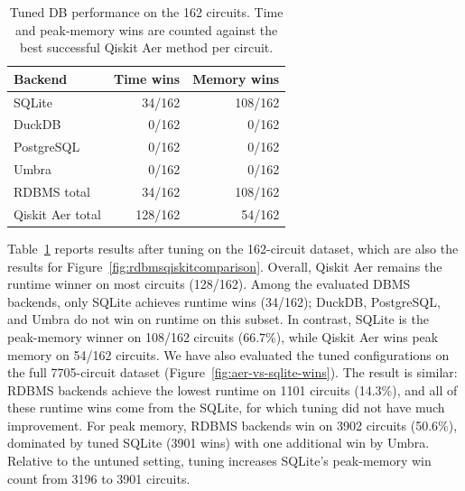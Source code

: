 \begin{table}[t]
  \centering
  \caption{Tuned DB performance on the 162 circuits. Time and peak-memory wins are counted against the best successful Qiskit Aer method per circuit.}
  \label{tab:finetuned-rdbms-results}
  \small
  \setlength{\tabcolsep}{6pt}
  \begin{tabular}{lrr}
    \toprule
    \textbf{Backend} & \textbf{Time wins} & \textbf{Memory wins} \\
    \midrule
    SQLite      & 34/162  & 108/162 \\
    DuckDB      & 0/162   & 0/162 \\
    PostgreSQL  & 0/162   & 0/162 \\
    Umbra       & 0/162   & 0/162 \\
    \midrule
    RDBMS total     & 34/162  & 108/162 \\
    Qiskit Aer total & 128/162 & 54/162 \\
    \bottomrule
  \end{tabular}
\end{table}

Table~\ref{tab:finetuned-rdbms-results} reports results after tuning 
on the 162-circuit dataset, which are also the results for Figure~\ref{fig:rdbmsqiskitcomparison}. Overall, Qiskit Aer
remains the runtime winner on most circuits (128/162). Among the evaluated DBMS backends,
only SQLite achieves runtime wins (34/162); DuckDB, PostgreSQL, and Umbra do not win on
runtime on this subset. In contrast, SQLite is the peak-memory winner on 108/162 circuits ($66.7\%$),
while Qiskit Aer wins peak memory on 54/162 circuits.
We have also evaluated the tuned configurations on the full \num{7705}-circuit dataset
(Figure~\ref{fig:aer-vs-sqlite-wins}). The result is similar: RDBMS backends achieve the
lowest runtime on \num{1101} circuits (14.3\%), and all of these runtime wins come from the SQLite, for which tuning did not have much improvement. For peak memory, RDBMS backends win on \num{3902}
circuits (50.6\%), dominated by tuned SQLite (\num{3901} wins) with one additional win
by Umbra. Relative to the untuned setting, tuning increases SQLite's peak-memory win count
from \num{3196} to \num{3901} circuits.

